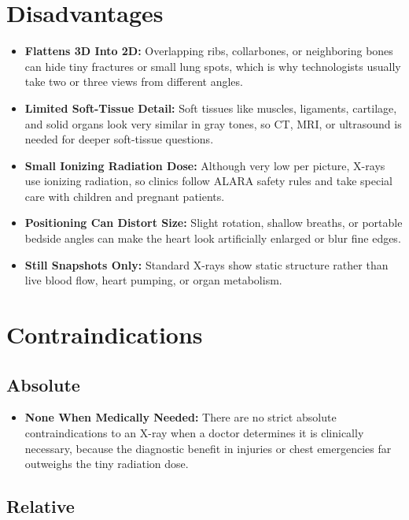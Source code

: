 \section{Disadvantages}

\begin{itemize}
    \item \textbf{Flattens 3D Into 2D:} Overlapping ribs, collarbones, or neighboring bones can hide tiny fractures or small lung spots, which is why technologists usually take two or three views from different angles.
    \item \textbf{Limited Soft-Tissue Detail:} Soft tissues like muscles, ligaments, cartilage, and solid organs look very similar in gray tones, so CT, MRI, or ultrasound is needed for deeper soft-tissue questions.
    \item \textbf{Small Ionizing Radiation Dose:} Although very low per picture, X-rays use ionizing radiation, so clinics follow ALARA safety rules and take special care with children and pregnant patients.
    \item \textbf{Positioning Can Distort Size:} Slight rotation, shallow breaths, or portable bedside angles can make the heart look artificially enlarged or blur fine edges.
    \item \textbf{Still Snapshots Only:} Standard X-rays show static structure rather than live blood flow, heart pumping, or organ metabolism.
\end{itemize}

\section{Contraindications}

\subsection{Absolute}

\begin{itemize}
    \item \textbf{None When Medically Needed:} There are no strict absolute contraindications to an X-ray when a doctor determines it is clinically necessary, because the diagnostic benefit in injuries or chest emergencies far outweighs the tiny radiation dose.
\end{itemize}

\subsection{Relative}

